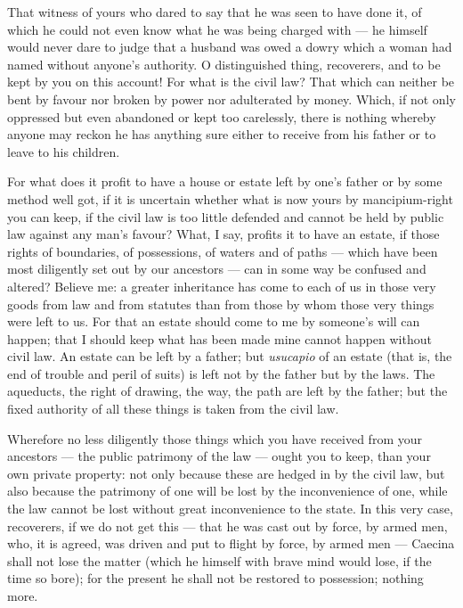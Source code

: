  That witness of yours who dared to say that he was seen to have done it, of which he could not even know what he was being charged with --- he himself would never dare to judge that a husband was owed a dowry which a woman had named without anyone's authority. O distinguished thing, recoverers, and to be kept by you on this account! For what is the civil law? That which can neither be bent by favour nor broken by power nor adulterated by money. Which, if not only oppressed but even abandoned or kept too carelessly, there is nothing whereby anyone may reckon he has anything sure either to receive from his father or to leave to his children.

 For what does it profit to have a house or estate left by one's father or by some method well got, if it is uncertain whether what is now yours by mancipium-right you can keep, if the civil law is too little defended and cannot be held by public law against any man's favour? What, I say, profits it to have an estate, if those rights of boundaries, of possessions, of waters and of paths --- which have been most diligently set out by our ancestors --- can in some way be confused and altered? Believe me: a greater inheritance has come to each of us in those very goods from law and from statutes than from those by whom those very things were left to us. For that an estate should come to me by someone's will can happen; that I should keep what has been made mine cannot happen without civil law. An estate can be left by a father; but \textit{usucapio} of an estate (that is, the end of trouble and peril of suits) is left not by the father but by the laws. The aqueducts, the right of drawing, the way, the path are left by the father; but the fixed authority of all these things is taken from the civil law.

 Wherefore no less diligently those things which you have received from your ancestors --- the public patrimony of the law --- ought you to keep, than your own private property: not only because these are hedged in by the civil law, but also because the patrimony of one will be lost by the inconvenience of one, while the law cannot be lost without great inconvenience to the state. In this very case, recoverers, if we do not get this --- that he was cast out by force, by armed men, who, it is agreed, was driven and put to flight by force, by armed men --- Caecina shall not lose the matter (which he himself with brave mind would lose, if the time so bore); for the present he shall not be restored to possession; nothing more.

